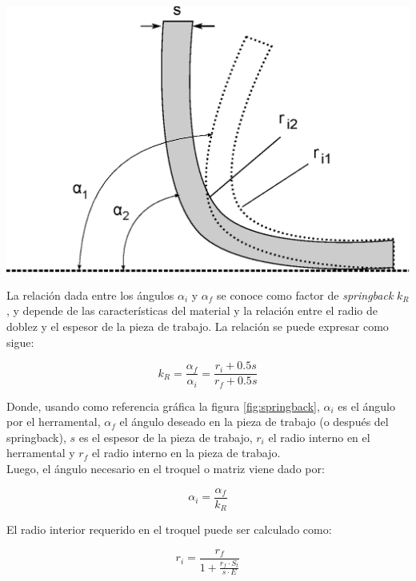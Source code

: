 \begin{center}
\includegraphics[scale=0.4]{src/ch2/springback.eps}
\label{fig:springback}
\end{center}

La relación dada entre los ángulos $\alpha_i$ y $\alpha_f$ se conoce como factor de \textit{springback} $k_R$, 
y depende de las características del material y la relación entre el radio de doblez y el espesor de la 
pieza de trabajo. La relación se puede expresar como sigue: ~\cite{schuler1998}

\begin{equation}\label{eq:factor_springback}
k_R = \frac{\alpha_f}{\alpha_i} = \frac{r_{i} + 0.5 s}{r_{f} + 0.5 s}
\end{equation}

Donde, usando como referencia gráfica la figura \ref{fig:springback}, $\alpha_i$ es el ángulo por el 
herramental, $\alpha_f$ el ángulo deseado en la pieza de trabajo (o después del springback), 
$s$ es el espesor de la pieza de trabajo, $r_{i}$ el radio interno en el herramental y $r_{f}$ el 
radio interno en la pieza de trabajo.\\

Luego, el ángulo necesario en el troquel o matriz viene dado por:

\begin{equation}
\alpha_i = \frac{\alpha_f}{k_R}
\end{equation}

El radio interior requerido en el troquel puede ser calculado como:

\begin{equation}
r_{i} = \frac{r_{f}}{1+\frac{r_{f} \cdot S_t}{s \cdot E}}
\end{equation}

